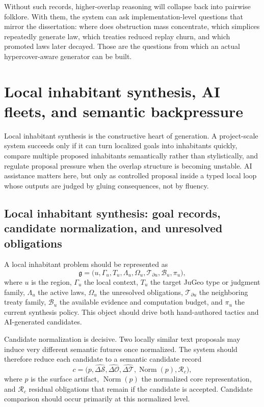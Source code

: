 \documentclass[11pt]{report}
\begin{document}
Without such records, higher-overlap reasoning will collapse back into pairwise folklore. With them, the system can ask implementation-level questions that mirror the dissertation: where does obstruction mass concentrate, which simplices repeatedly generate law, which treaties reduced replay churn, and which promoted laws later decayed. Those are the questions from which an actual hypercover-aware generator can be built.

\chapter{Local inhabitant synthesis, AI fleets, and semantic backpressure}
Local inhabitant synthesis is the constructive heart of generation. A project-scale system succeeds only if it can turn localized goals into inhabitants quickly, compare multiple proposed inhabitants semantically rather than stylistically, and regulate proposal pressure when the overlap structure is becoming unstable. AI assistance matters here, but only as controlled proposal inside a typed local loop whose outputs are judged by gluing consequences, not by fluency.

\section{Local inhabitant synthesis: goal records, candidate normalization, and unresolved obligations}
A local inhabitant problem should be represented as
\[
\mathfrak{g}
=
\bigl(
u,
\Gamma_u,
T_u,
\Lambda_u,
\Omega_u,
\mathcal{T}_{\partial u},
\mathcal{B}_u,
\pi_u
\bigr),
\]
where $u$ is the region, $\Gamma_u$ the local context, $T_u$ the target JuGeo type or judgment family, $\Lambda_u$ the active laws, $\Omega_u$ the unresolved obligations, $\mathcal{T}_{\partial u}$ the neighboring treaty family, $\mathcal{B}_u$ the available evidence and computation budget, and $\pi_u$ the current synthesis policy. This object should drive both hand-authored tactics and AI-generated candidates.

Candidate normalization is decisive. Two locally similar text proposals may induce very different semantic futures once normalized. The system should therefore reduce each candidate to a semantic candidate record
\[
c
=
\bigl(
p,
\widehat{\Delta \mathcal{S}},
\widehat{\Delta \mathcal{O}},
\widehat{\Delta \mathcal{T}},
\operatorname{Norm}(p),
\mathcal{R}_c
\bigr),
\]
where $p$ is the surface artifact, $\operatorname{Norm}(p)$ the normalized core representation, and $\mathcal{R}_c$ residual obligations that remain if the candidate is accepted. Candidate comparison should occur primarily at this normalized level.
\end{document}
